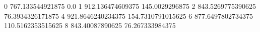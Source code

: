 0 767.133544921875 0.0
1 912.136474609375 145.0029296875
2 843.5269775390625 76.3934326171875
4 921.8646240234375 154.7310791015625
6 877.6497802734375 110.5162353515625
8 843.40087890625 76.267333984375

